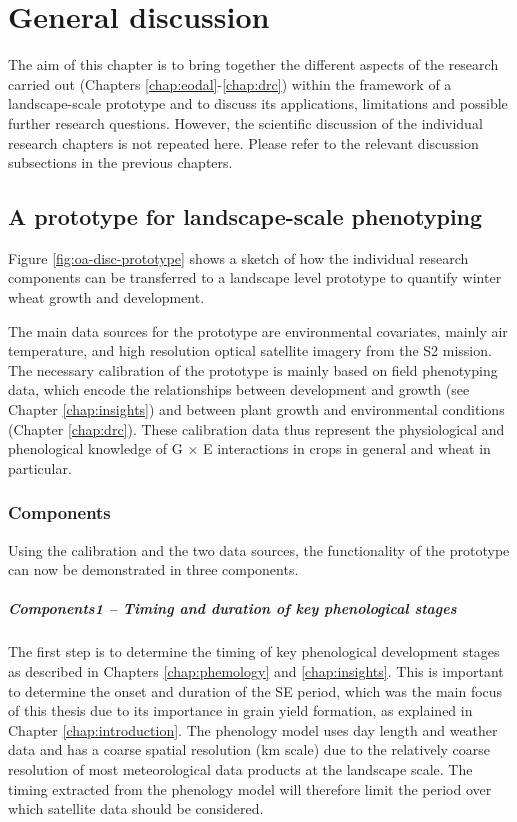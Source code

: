 \chapter{General discussion}
\label{chap:general-discussion}

The aim of this chapter is to bring together the different aspects of the research carried out (Chapters \ref{chap:eodal}-\ref{chap:drc}) within the framework of a landscape-scale prototype and to discuss its applications, limitations and possible further research questions. However, the scientific discussion of the individual research chapters is not repeated here. Please refer to the relevant discussion subsections in the previous chapters.

\section{A prototype for landscape-scale phenotyping}
Figure \ref{fig:oa-disc-prototype} shows a sketch of how the individual research components can be transferred to a landscape level prototype to quantify winter wheat growth and development.

The main data sources for the prototype are environmental covariates, mainly air temperature, and high resolution optical satellite imagery from the \gls{S2} mission. The necessary calibration of the prototype is mainly based on field phenotyping data, which encode the relationships between development and growth (see Chapter \ref{chap:insights}) and between plant growth and environmental conditions (Chapter \ref{chap:drc}). These calibration data thus represent the physiological and phenological knowledge of G $\times$ E interactions in crops in general and wheat in particular.

\subsection{Components}
Using the calibration and the two data sources, the functionality of the prototype can now be demonstrated in three components.

\paragraph{Components1 -- Timing and duration of key phenological stages}
The first step is to determine the timing of key phenological development stages as described in Chapters \ref{chap:phemology} and \ref{chap:insights}. This is important to determine the onset and duration of the \gls{SE} period, which was the main focus of this thesis due to its importance in grain yield formation, as explained in Chapter \ref{chap:introduction}. The phenology model uses day length and weather data and has a coarse spatial resolution (km scale) due to the relatively coarse resolution of most meteorological data products at the landscape scale. The timing extracted from the phenology model will therefore limit the period over which satellite data should be considered.

